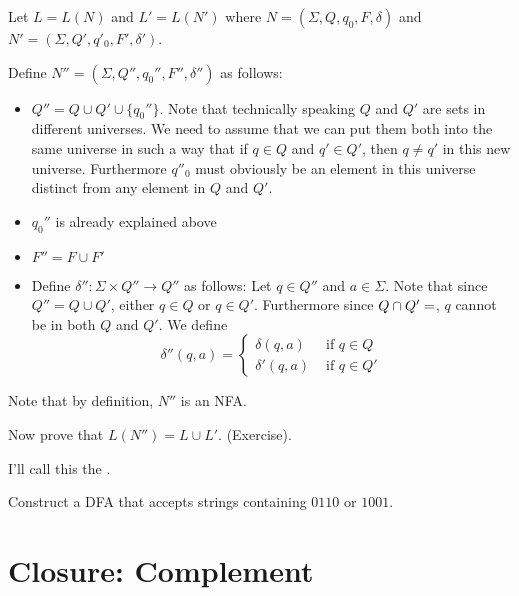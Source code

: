 Let $L = L(N)$ and $L' = L(N')$ where $N = (\Sigma, Q, q_0, F,
\delta)$ and $N' = (\Sigma, Q', q'_0, F', \delta')$.

Define $N'' = (\Sigma, Q'', q_0'', F'', \delta'')$ as follows:
\begin{itemize}
\item $Q'' = Q \cup Q' \cup\{q_0''\}$. Note that technically
  speaking $Q$ and $Q'$ are sets in different universes. We need to
  assume that we can put them both into the same universe in such a
  way that if $q \in Q$ and $q' \in Q'$, then $q \neq q'$ in this new
  universe. Furthermore $q''_0$ must obviously be an element in this
  universe distinct from any element in $Q$ and $Q'$.
\item $q_0''$ is already explained above
\item $F'' = F \cup F'$
\item Define $\delta'' : \Sigma \times Q'' \rightarrow Q''$ as
  follows: Let $q \in Q''$ and $a \in \Sigma$. Note that since $Q'' = Q \cup Q'$, either
  $q \in Q$ or $q \in Q'$. Furthermore since $Q \cap Q' = \empty$, $q$
  cannot be in both $Q$ and $Q'$. We define
  \[
  \delta''(q,a) =
  \begin{cases}
    \delta(q,a) & \text{ if } q \in Q \\
    \delta'(q,a) & \text{ if } q \in Q'
  \end{cases}
  \]
\end{itemize}
Note that by definition, $N''$ is an NFA.

Now prove that $L(N'') = L \cup L'$. (Exercise).

I'll call this the .



\newpage
\begin{ex}
Construct a DFA that accepts strings containing $0110$ or $1001$.
\end{ex}



\newpage
\section{Closure: Complement}

